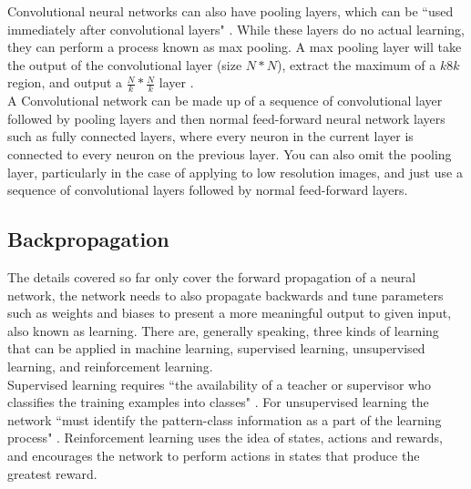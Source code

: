 \documentclass[10pt]{article}
\begin{document}
		Convolutional neural networks can also have pooling layers, which can be ``used immediately after convolutional layers" \cite{nndl}. While these layers do no actual learning, they can perform a process known as max pooling. A max pooling layer will take the output of the convolutional layer (size $N*N$), extract the maximum of a $k8k$ region, and output a $\frac{N}{k} * \frac{N}{k}$ layer \cite{convNN}.\\
		
		A Convolutional network can be made up of a sequence of convolutional layer followed by pooling layers and then normal feed-forward neural network layers such as fully connected layers, where every neuron in the current layer is connected to every neuron on the previous layer. You can also omit the pooling layer, particularly in the case of applying to low resolution images, and just use a sequence of convolutional layers followed by normal feed-forward layers.\\
		
		\medskip
		
		\subsection{Backpropagation}
		
		The details covered so far only cover the forward propagation of a neural network, the network needs to also propagate backwards and tune parameters such as weights and biases to present a more meaningful output to given input, also known as learning. There are, generally speaking, three kinds of learning that can be applied in machine learning, supervised learning, unsupervised learning, and reinforcement learning.\\
		 Supervised learning requires ``the availability of a teacher or supervisor who classifies the training examples into classes" \cite{nnintell}. For unsupervised learning the network ``must identify the pattern-class information as a part of the learning process" \cite{nnintell}. Reinforcement learning uses the idea of states, actions and rewards, and encourages the network to perform actions in states that produce the greatest reward.\\
		 
\end{document}
